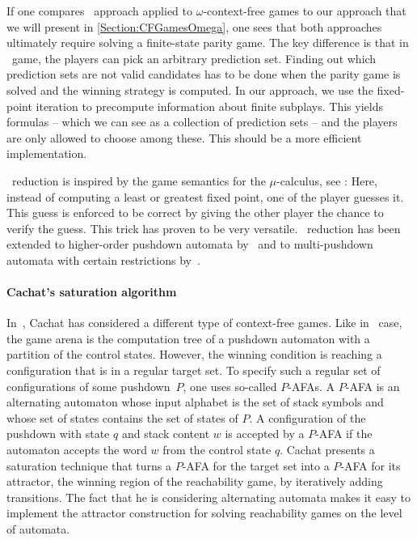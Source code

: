 \documentclass[../../diss.tex]{subfiles}
\begin{document}
If one compares \Walus~approach applied to $\omega$-context-free games to our approach that we will present in \cref{Section:CFGamesOmega}, one sees that both approaches ultimately require solving a finite-state parity game.
The key difference is that in \Walus~game, the players can pick an arbitrary prediction set.
Finding out which prediction sets are not valid candidates has to be done when the parity game is solved and the winning strategy is computed.
In our approach, we use the fixed-point iteration to precompute information about finite subplays.
This yields formulas -- which we can see as a collection of prediction sets -- and the players are only allowed to choose among these.
This should be a more efficient implementation.

\Walus~reduction is inspired by the game semantics for the $\mu$-calculus, see \eg \cite{BradfieldW18}:
Here, instead of computing a least or greatest fixed point, one of the player guesses it.
This guess is enforced to be correct by giving the other player the chance to verify the guess.
This trick has proven to be very versatile.
\Walus~reduction has been extended to higher-order pushdown automata by~ and to multi-pushdown automata with certain restrictions by~.

\paragraph{Cachat's saturation algorithm}

In~\cite{Cachat02}, Cachat has considered a different type of context-free games.
Like in \Walus~case, the game arena is the computation tree of a pushdown automaton with a partition of the control states.
However, the winning condition is reaching a configuration that is in a regular target set.
To specify such a regular set of configurations of some pushdown~$P$, one uses so-called $P$-AFAs.
A $P$-AFA is an alternating automaton whose input alphabet is the set of stack symbols and whose set of states contains the set of states of $P$.
A configuration of the pushdown with state $q$ and stack content $w$ is accepted by a $P$-AFA if the automaton accepts the word $w$ from the control state $q$.
Cachat presents a saturation technique that turns a $P$-AFA for the target set into a $P$-AFA for its attractor, the winning region of the reachability game, by iteratively adding transitions.
The fact that he is considering alternating automata makes it easy to implement the attractor construction for solving reachability games on the level of automata.
\end{document}
